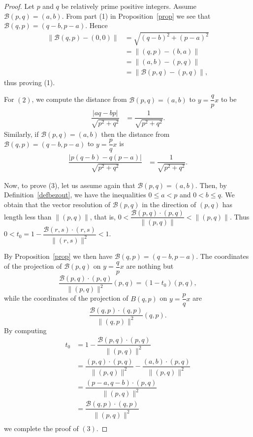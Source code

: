 \documentclass[10pt,a4paper]{amsart}
\newcommand{\B}{\mathcal B}
\begin{document}
\begin{proof}
   
Let $p$ and $q$  be relatively prime positive integers. Assume $\B(p,q)=(a,b)$. From part (1) in Proposition~\ref{prop} we see that $\B(q,p)=(q-b,p-a)$. Hence
\begin{align*}
    \|\B(q,p) -(0,0)\| &= \sqrt{(q-b)^2+(p-a)^2}\\
                       &=\| (q,p)-(b,a)\|\\
                       &= \| (a,b)-(p,q)\|\\
                       &=\| \B(p,q)-(p,q)\|,
\end{align*}
thus proving (1).


For $(2)$, we compute the distance from $\B(p,q)=(a,b)$ to $y=\dfrac{q}{p}x$ to be 
\begin{align*}
    \dfrac{\left| aq-bp\right|}{\sqrt{p^2+q^2}} &= \dfrac{1}{\sqrt{p^2+q^2}}.
\end{align*}
 Similarly, if $\B(p,q)=(a,b)$ then the distance from $\B(q,p)=(q-b,p-a)$ to $y=\dfrac{p}{q}x$ is
\begin{align*}
    \dfrac{\left| p(q-b)-q(p-a)\right|}{\sqrt{p^2+q^2}} &= \dfrac{1}{\sqrt{p^2+q^2}}.
\end{align*}

Now, to prove (3), let us assume again that $\B(p,q)=(a,b)$.  Then, by Definition~\ref{defbezout}, we have the inequalities $0\leq a <p$ and $0<b\leq q$. %
We obtain that the vector resolution of $\B(p,q)$ in the direction of $(p,q)$ has length less than $\|(p,q)\|$, that is, $0< \dfrac{\B(p,q)\cdot (p,q)}{\|(p,q)\|}< \|(p,q)\|$. Thus $0< t_0 =1-\dfrac{\B(r,s)\cdot (r,s)}{\|(r,s)\|^2}< 1$. 

By Proposition~\ref{prop} we then have $\B(q,p)=(q-b,p-a)$. The coordinates of the projection of   $\B(p,q)$ on $y=\dfrac{q}{p}x$ are nothing but
\begin{equation*}
    \dfrac{\B(p,q)\cdot (p,q)}{\|(p,q)\|^2} (p,q)=(1-t_0)(p,q),
\end{equation*}
while the coordinates of the projection of $B(q,p)$ on $y=\dfrac{p}{q}x$ are
\begin{equation*}
    \dfrac{\B(q,p)\cdot (q,p)}{\|(q,p)\|^2} (q,p).
\end{equation*}
 By computing
 \begin{align*}
     t_0&=1-\dfrac{\B(p,q)\cdot (p,q)}{\|(p,q)\|^2} \\
     &=\dfrac{(p,q)\cdot (p,q)}{\|(p,q)\|^2}-\dfrac{(a,b)\cdot (p,q)}{\|(p,q)\|^2}\\
     &=\dfrac{(p-a,q-b)\cdot (p,q)}{\|(p,q)\|^2}\\
     &=\dfrac{\B(q,p)\cdot (q,p)}{\|(p,q)\|^2}\\
\end{align*}
 we complete the proof of $(3)$.
 

\end{proof}
\end{document}
